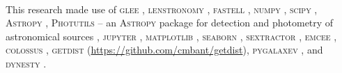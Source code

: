 \documentclass[longauth]{aa}
\begin{document}
\begin{acknowledgements}
\\
This research made use of \textsc{glee} \citep{Suyu10b, Suyu12c}, \textsc{lenstronomy} \citep{Birrer15, Birrer18, Birrer21b}, \textsc{fastell} \citep{Barkana99}, \textsc{numpy} \citep{Oliphant15}, \textsc{scipy} \citep{Jones01}, \textsc{Astropy} \citep{AstropyCollaboration13, AstropyCollaboration18}, \textsc{Photutils} -- an \textsc{Astropy} package for detection and photometry of astronomical sources \citep{Bradley20},  \textsc{jupyter} \citep{Kluyver16}, \textsc{matplotlib} \citep{Hunter07}, \textsc{seaborn} \citep{Waskom14}, \textsc{sextractor} \citep{Bertin96}, \textsc{emcee} \citep{Foreman-Mackey13}, \textsc{colossus} \citep{Diemer18}, \textsc{getdist} (\url{https://github.com/cmbant/getdist}), \textsc{pygalaxev} \citep{Bruzual03}, and \textsc{dynesty} \citep{Skilling04, Speagle19}.

\end{acknowledgements}



\end{document}
